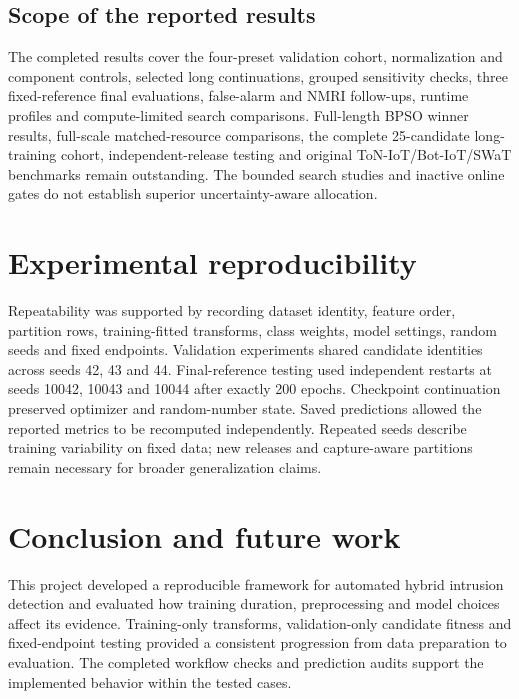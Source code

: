 \documentclass[11pt,a4paper]{report}
\begin{document}
\section{Scope of the reported results}
The completed results cover the four-preset validation cohort, normalization and component controls, selected long continuations, grouped sensitivity checks, three fixed-reference final evaluations, false-alarm and NMRI follow-ups, runtime profiles and compute-limited search comparisons. Full-length BPSO winner results, full-scale matched-resource comparisons, the complete 25-candidate long-training cohort, independent-release testing and original ToN-IoT/Bot-IoT/SWaT benchmarks remain outstanding. The bounded search studies and inactive online gates do not establish superior uncertainty-aware allocation.

\chapter{Experimental reproducibility}
Repeatability was supported by recording dataset identity, feature order, partition rows, training-fitted transforms, class weights, model settings, random seeds and fixed endpoints. Validation experiments shared candidate identities across seeds 42, 43 and 44. Final-reference testing used independent restarts at seeds 10042, 10043 and 10044 after exactly 200 epochs. Checkpoint continuation preserved optimizer and random-number state. Saved predictions allowed the reported metrics to be recomputed independently. Repeated seeds describe training variability on fixed data; new releases and capture-aware partitions remain necessary for broader generalization claims.

\chapter{Conclusion and future work}
This project developed a reproducible framework for automated hybrid intrusion detection and evaluated how training duration, preprocessing and model choices affect its evidence. Training-only transforms, validation-only candidate fitness and fixed-endpoint testing provided a consistent progression from data preparation to evaluation. The completed workflow checks and prediction audits support the implemented behavior within the tested cases.
\end{document}
